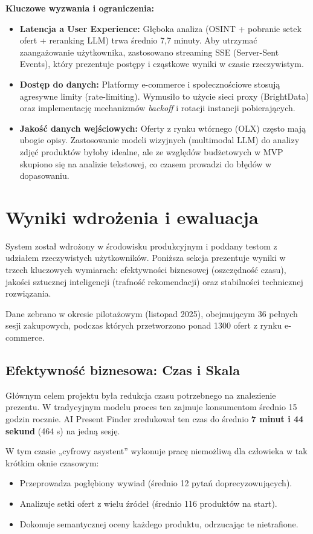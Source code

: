 \documentclass[polish,edition=2025]{zpiday}
\begin{document}
\textbf{Kluczowe wyzwania i ograniczenia:}
\begin{itemize}
    \item \textbf{Latencja a User Experience:} Głęboka analiza (OSINT + pobranie setek ofert + reranking LLM) trwa średnio 7,7 minuty. Aby utrzymać zaangażowanie użytkownika, zastosowano streaming SSE (Server-Sent Events), który prezentuje postępy i cząstkowe wyniki w czasie rzeczywistym.
    \item \textbf{Dostęp do danych:} Platformy e-commerce i społecznościowe stosują agresywne limity (rate-limiting). Wymusiło to użycie sieci proxy (BrightData) oraz implementację mechanizmów \textit{backoff} i rotacji instancji pobierających.
    \item \textbf{Jakość danych wejściowych:} Oferty z rynku wtórnego (OLX) często mają ubogie opisy. Zastosowanie modeli wizyjnych (multimodal LLM) do analizy zdjęć produktów byłoby idealne, ale ze względów budżetowych w MVP skupiono się na analizie tekstowej, co czasem prowadzi do błędów w dopasowaniu.
\end{itemize}

\section{Wyniki wdrożenia i ewaluacja}

System został wdrożony w środowisku produkcyjnym i poddany testom z udziałem rzeczywistych użytkowników. Poniższa sekcja prezentuje wyniki w trzech kluczowych wymiarach: efektywności biznesowej (oszczędność czasu), jakości sztucznej inteligencji (trafność rekomendacji) oraz stabilności technicznej rozwiązania.

Dane zebrano w okresie pilotażowym (listopad 2025), obejmującym 36 pełnych sesji zakupowych, podczas których przetworzono ponad 1300 ofert z rynku e-commerce.

\subsection{Efektywność biznesowa: Czas i Skala}

Głównym celem projektu była redukcja czasu potrzebnego na znalezienie prezentu. W tradycyjnym modelu proces ten zajmuje konsumentom średnio 15 godzin rocznie. AI Present Finder zredukował ten czas do średnio \textbf{7 minut i 44 sekund} (464 s) na jedną sesję.

W tym czasie „cyfrowy asystent” wykonuje pracę niemożliwą dla człowieka w tak krótkim oknie czasowym:
\begin{itemize}
    \item Przeprowadza pogłębiony wywiad (średnio 12 pytań doprecyzowujących).
    \item Analizuje setki ofert z wielu źródeł (średnio 116 produktów na start).
    \item Dokonuje semantycznej oceny każdego produktu, odrzucając te nietrafione.
\end{itemize}
\end{document}
